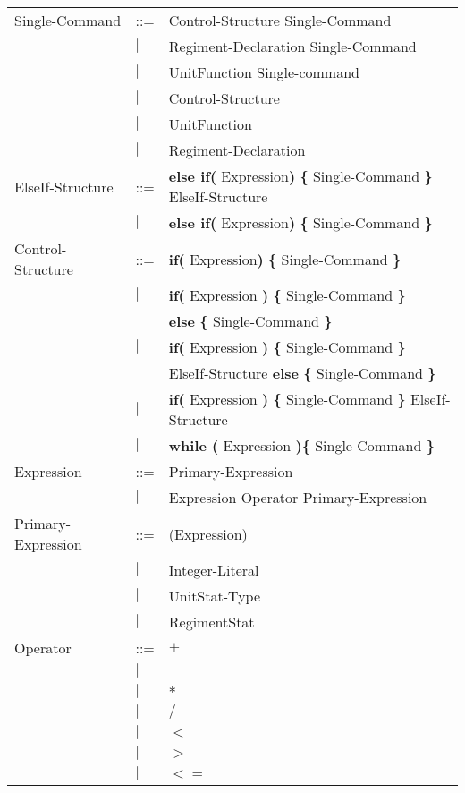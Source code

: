 \begin{center}
\begin{longtable}{l l p{7cm}}
Single-Command				&	::=	&Control-Structure Single-Command \\
							&$\mid$	&Regiment-Declaration Single-Command\\
							&$\mid$	&UnitFunction Single-command\\
							&$\mid$	&Control-Structure\\
							&$\mid$	&UnitFunction\\
							&$\mid$	&Regiment-Declaration\\
ElseIf-Structure			&	::=	&{\bf else if( } Expression{\bf )} {\bf \{ } Single-Command {\bf \} } ElseIf-Structure\\
							&$\mid$	&{\bf else if( } Expression{\bf )} {\bf \{ } Single-Command {\bf \} } \\
Control-Structure			&	::=	&{\bf if( } Expression{\bf )} {\bf \{ } Single-Command {\bf \} }  \\
							&$\mid$	&{\bf if(} Expression {\bf )} {\bf \{ }Single-Command {\bf \}} \\
							&		&{\bf else } {\bf \{ }Single-Command {\bf \} } \\			
							&$\mid$	&{\bf if(} Expression {\bf )} {\bf \{ }Single-Command {\bf \}} \\
							&		&ElseIf-Structure {\bf else } {\bf \{ }Single-Command {\bf \} } \\
							&$\mid$	&{\bf if(} Expression {\bf )} {\bf \{ }Single-Command {\bf \}} ElseIf-Structure \\	
							&$\mid$	&{\bf while (} Expression {\bf )}{\bf \{ } Single-Command {\bf \}} \\
Expression					&	::=	&Primary-Expression \\
							&$\mid$	&Expression Operator Primary-Expression \\
Primary-Expression			&	::=	&(Expression)\\
							&$\mid$	&Integer-Literal \\
							&$\mid$	&UnitStat-Type \\
							&$\mid$	&RegimentStat \\
Operator					&	::=	&$\boldsymbol {+}$\\
							&$\mid$	&$\boldsymbol {-}$\\
							&$\mid$	&$\boldsymbol {*}$\\
							&$\mid$	&$\boldsymbol {/}$\\
							&$\mid$	&$\boldsymbol {<}$\\
							&$\mid$	&$\boldsymbol {>}$\\
							&$\mid$	&$\boldsymbol {<=}$\\

\end{longtable}
\end{center}
